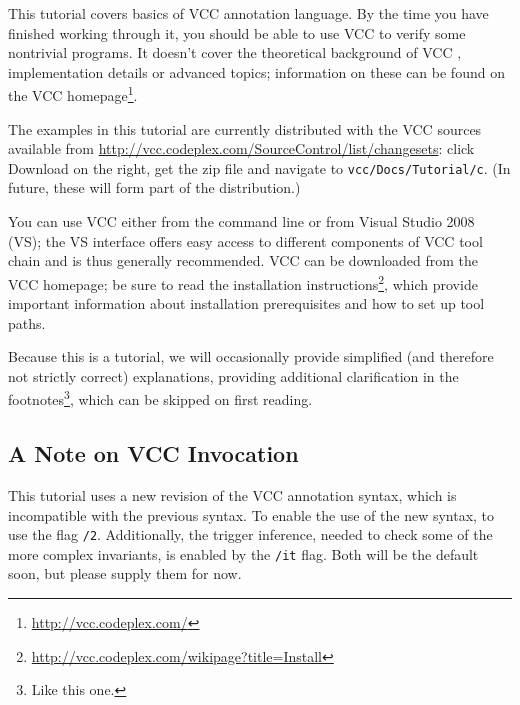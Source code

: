 This tutorial covers basics of VCC annotation language. By the time
you have finished working through it, you should be able to use VCC to
verify some nontrivial programs. It doesn't cover the theoretical
background of VCC \cite{lci}, implementation details \cite{vcc}
or advanced topics;
information on these can be found on the VCC
homepage\footnote{\url{http://vcc.codeplex.com/}}.


The examples in this tutorial are currently distributed with the VCC sources
available from \url{http://vcc.codeplex.com/SourceControl/list/changesets}: click Download on the right,
get the zip file and navigate to \lstinline|vcc/Docs/Tutorial/c|. (In
future, these will form part of the distribution.)

You can use VCC either from the command line or from Visual Studio
2008 (VS); the VS interface offers easy access to different components of
VCC tool chain and is thus generally recommended.
VCC can be downloaded from the VCC homepage; 
be sure to read the installation instructions\footnote{\url{http://vcc.codeplex.com/wikipage?title=Install}},
which provide important information about installation prerequisites 
and how to set up tool paths.



Because this is a tutorial, we will occasionally provide simplified (and
therefore not strictly correct) explanations, providing
additional clarification in the footnotes\footnote{Like this one.},
which can be skipped on first reading. 

\subsection{A Note on VCC Invocation}
This tutorial uses a new revision of the VCC annotation syntax, which
is incompatible with the previous syntax.  To enable the use of the
new syntax, to use the flag \texttt{/2}.  Additionally, the trigger
inference, needed to check some of the more complex invariants, is
enabled by the \texttt{/it} flag. Both will be the default soon, but
please supply them for now.


